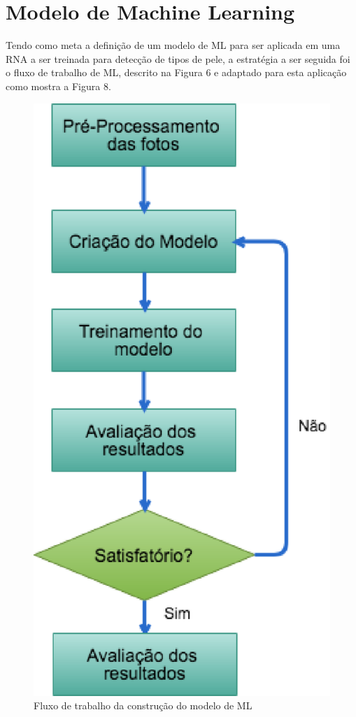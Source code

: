 \section{Modelo de Machine Learning}

    Tendo como meta a definição de um modelo de ML para ser aplicada em uma RNA a ser treinada para detecção de tipos de pele, a estratégia a ser seguida foi o fluxo de trabalho de ML, descrito na Figura 6 e adaptado para esta aplicação como mostra a Figura 8.

    \begin{figure}[ht]
        \centering
        \label{fig08}
            \includegraphics[keepaspectratio=true, scale=0.4]{editaveis/images/ml_nt_flow.eps}
        \caption{Fluxo de trabalho da construção do modelo de ML}
    \end{figure}

